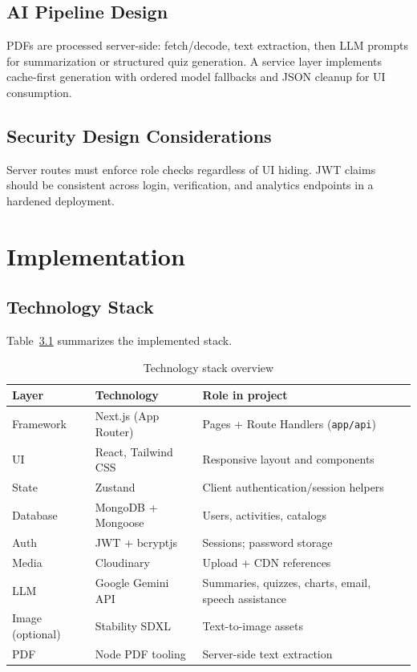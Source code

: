 \documentclass[a4paper,12pt,openany]{report}
\begin{document}
\section{AI Pipeline Design}
PDFs are processed server-side: fetch/decode, text extraction, then LLM prompts for summarization or structured quiz generation. A service layer implements cache-first generation with ordered model fallbacks and JSON cleanup for UI consumption.

\section{Security Design Considerations}
Server routes must enforce role checks regardless of UI hiding. JWT claims should be consistent across login, verification, and analytics endpoints in a hardened deployment.

\chapter{Implementation}

\section{Technology Stack}
Table~\ref{tab:stack} summarizes the implemented stack.

\begin{table}[htbp]
\centering
\caption{Technology stack overview}
\label{tab:stack}
\begin{tabular}{@{}llp{6.8cm}@{}}
\toprule
\textbf{Layer} & \textbf{Technology} & \textbf{Role in project} \\
\midrule
Framework & Next.js (App Router) & Pages + Route Handlers (\texttt{app/api}) \\
UI & React, Tailwind CSS & Responsive layout and components \\
State & Zustand & Client authentication/session helpers \\
Database & MongoDB + Mongoose & Users, activities, catalogs \\
Auth & JWT + bcryptjs & Sessions; password storage \\
Media & Cloudinary & Upload + CDN references \\
LLM & Google Gemini API & Summaries, quizzes, charts, email, speech assistance \\
Image (optional) & Stability SDXL & Text-to-image assets \\
PDF & Node PDF tooling & Server-side text extraction \\
\bottomrule
\end{tabular}
\end{table}
\end{document}
